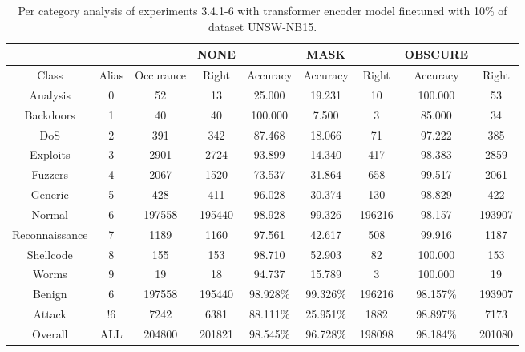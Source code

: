 \begin{table}[htb]
    \centering
    \begin{tabular}{@{}ccccccccc@{}}
        \toprule
         &  &  & NONE &  & MASK &  & OBSCURE &  \\
        \midrule
        Class &  Alias &  Occurance &  Right &  Accuracy &  Accuracy &  Right &  Accuracy &  Right \\
        Analysis &  0 &  52 &  13 &  25.000 &  19.231 &  10 &  100.000 &  53 \\
        Backdoors &  1 &  40 &  40 &  100.000 &  7.500 &  3 &  85.000 &  34 \\
        DoS &  2 &  391 &  342 &  87.468 &  18.066 &  71 &  97.222 &  385 \\
        Exploits &  3 &  2901 &  2724 &  93.899 &  14.340 &  417 &  98.383 &  2859 \\
        Fuzzers &  4 &  2067 &  1520 &  73.537 &  31.864 &  658 &  99.517 &  2061 \\
        Generic &  5 &  428 &  411 &  96.028 &  30.374 &  130 &  98.829 &  422 \\
        Normal &  6 &  197558 &  195440 &  98.928 &  99.326 &  196216 &  98.157 &  193907 \\
        Reconnaissance &  7 &  1189 &  1160 &  97.561 &  42.617 &  508 &  99.916 &  1187 \\
        Shellcode &  8 &  155 &  153 &  98.710 &  52.903 &  82 &  100.000 &  153 \\
        Worms &  9 &  19 &  18 &  94.737 &  15.789 &  3 &  100.000 &  19 \\
        Benign &  6 &  197558 &  195440 &  98.928\% &  99.326\% &  196216 &  98.157\% &  193907 \\
        Attack &  !6 &  7242 &  6381 &  88.111\% &  25.951\% &  1882 &  98.897\% &  7173 \\
        Overall &  ALL &  204800 &  201821 &  98.545\% &  96.728\% &  198098 &  98.184\% &  201080 \\
        \bottomrule
    \end{tabular}
    \caption{Per category analysis of experiments 3.4.1-6 with transformer encoder model finetuned with 10\% of dataset UNSW-NB15.}
    \label{table:results:lstm:class_flows15_10}
\end{table}